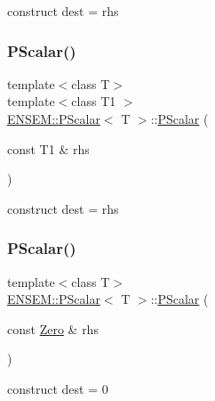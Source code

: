 construct dest = rhs 

\mbox{\label{classENSEM_1_1PScalar_a99cdd295d67d2d32aa481a4a8d9dcc1b}} 
\subsubsection{\texorpdfstring{PScalar()}{PScalar()}\hspace{0.1cm}{\footnotesize\ttfamily [10/12]}}
{\footnotesize\ttfamily template$<$class T$>$ \\
template$<$class T1 $>$ \\
\mbox{\hyperlink{classENSEM_1_1PScalar}{E\+N\+S\+E\+M\+::\+P\+Scalar}}$<$ T $>$\+::\mbox{\hyperlink{classENSEM_1_1PScalar}{P\+Scalar}} (\begin{DoxyParamCaption}\item[{const T1 \&}]{rhs }\end{DoxyParamCaption})\hspace{0.3cm}{\ttfamily [inline]}}



construct dest = rhs 

\mbox{\label{classENSEM_1_1PScalar_a9d7f56a0caeb05ee423b451d2f3aae3b}} 
\subsubsection{\texorpdfstring{PScalar()}{PScalar()}\hspace{0.1cm}{\footnotesize\ttfamily [11/12]}}
{\footnotesize\ttfamily template$<$class T$>$ \\
\mbox{\hyperlink{classENSEM_1_1PScalar}{E\+N\+S\+E\+M\+::\+P\+Scalar}}$<$ T $>$\+::\mbox{\hyperlink{classENSEM_1_1PScalar}{P\+Scalar}} (\begin{DoxyParamCaption}\item[{const \mbox{\hyperlink{structENSEM_1_1Zero}{Zero}} \&}]{rhs }\end{DoxyParamCaption})\hspace{0.3cm}{\ttfamily [inline]}}



construct dest = 0 

